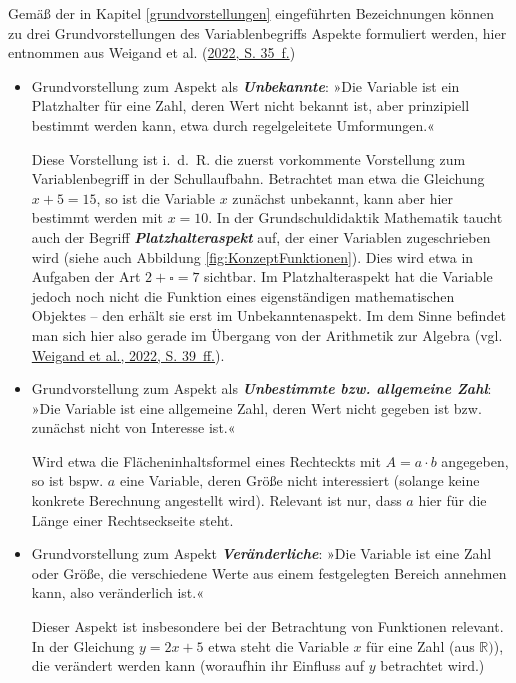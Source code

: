 \documentclass[
]{scrbook}
\theoremstyle{definition}
\theoremstyle{definition}
\theoremstyle{definition}
\theoremstyle{definition}
\theoremstyle{remark}
\begin{document}
Gemäß der in Kapitel \ref{grundvorstellungen} eingeführten Bezeichnungen können zu drei Grundvorstellungen des Variablenbegriffs Aspekte formuliert werden, hier entnommen aus Weigand et al. (\protect\hyperlink{ref-Weigand2022}{2022, S. 35~f.})

\begin{itemize}
\item
  Grundvorstellung zum Aspekt als \textbf{\emph{Unbekannte}}: »Die Variable ist ein Platzhalter für eine Zahl, deren Wert nicht bekannt ist, aber prinzipiell bestimmt werden kann, etwa durch regelgeleitete Umformungen.«

  Diese Vorstellung ist i.~d.~R. die zuerst vorkommente Vorstellung zum Variablenbegriff in der Schullaufbahn. Betrachtet man etwa die Gleichung \(x+5 = 15\), so ist die Variable \(x\) zunächst unbekannt, kann aber hier bestimmt werden mit \(x = 10\). In der Grundschuldidaktik Mathematik taucht auch der Begriff \textbf{\emph{Platzhalteraspekt}} auf, der einer Variablen zugeschrieben wird (siehe auch Abbildung \ref{fig:KonzeptFunktionen}). Dies wird etwa in Aufgaben der Art \(2 + \square = 7\) sichtbar. Im Platzhalteraspekt hat die Variable jedoch noch nicht die Funktion eines eigenständigen mathematischen Objektes -- den erhält sie erst im Unbekanntenaspekt. Im dem Sinne befindet man sich hier also gerade im Übergang von der Arithmetik zur Algebra (vgl. \protect\hyperlink{ref-Weigand2022}{Weigand et al., 2022, S. 39~ff.}).
\item
  Grundvorstellung zum Aspekt als \textbf{\emph{Unbestimmte bzw. allgemeine Zahl}}: »Die Variable ist eine allgemeine Zahl, deren Wert nicht gegeben ist bzw. zunächst nicht von Interesse ist.«

  Wird etwa die Flächeninhaltsformel eines Rechteckts mit \(A = a\cdot b\) angegeben, so ist bspw. \(a\) eine Variable, deren Größe nicht interessiert (solange keine konkrete Berechnung angestellt wird). Relevant ist nur, dass \(a\) hier für die Länge einer Rechtseckseite steht.
\item
  Grundvorstellung zum Aspekt \textbf{\emph{Veränderliche}}: »Die Variable ist eine Zahl oder Größe, die verschiedene Werte aus einem festgelegten Bereich annehmen kann, also veränderlich ist.«

  Dieser Aspekt ist insbesondere bei der Betrachtung von Funktionen relevant. In der Gleichung \(y = 2x+5\) etwa steht die Variable \(x\) für eine Zahl (aus \(\mathbb{R)}\)), die verändert werden kann (woraufhin ihr Einfluss auf \(y\) betrachtet wird.)
\end{itemize}
\end{document}
